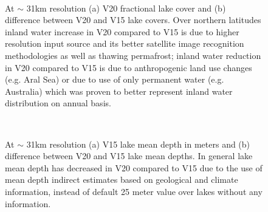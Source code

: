 \documentclass[hess, twostagejnl]{copernicus}
\providecommand{\DIFadd}[1]{{\protect\color{blue} \sf #1}} %
\providecommand{\DIFaddFL}[1]{\DIFadd{#1}} %
\begin{document}
\begin{figure}
	 \\
	\caption{\DIFaddFL{At $\sim$ 31km resolution (a) V20 fractional lake cover and (b) difference between V20 and V15 lake covers. Over northern latitudes inland water increase in V20 compared to V15 is due to higher resolution input source and its better satellite image recognition methodologies as well as thawing permafrost; inland water reduction in V20 compared to V15 is due to anthropogenic land use changes (e.g. Aral Sea) or due to use of only permanent water (e.g. Australia) which was proven to better represent inland water distribution on annual basis.}} 
	\label{fig:example_figure_a}
\end{figure}



\begin{figure}
	 \\
	\caption{\DIFaddFL{At $\sim$ 31km resolution (a) V15 lake mean depth in meters and (b) difference between V20 and V15 lake mean depths. In general lake mean depth has decreased in V20 compared to V15 due to the use of mean depth indirect estimates based on geological and climate information, instead of default 25 meter value over lakes without any information.}} 
	\label{fig:example_figure_b}
	\end{figure}
\end{document}
